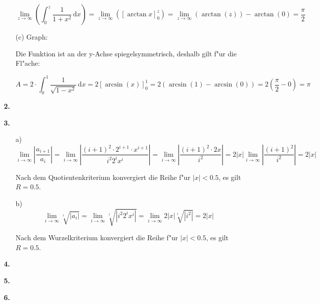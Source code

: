 \documentclass[a4paper,11pt,fleqn]{scrartcl}
\newcommand{\bra}[1]{\left(#1\right)}
\newcommand{\limz}[1]{\lim\limits_{z \rightarrow \infty}\bra{#1}}
\newcommand{\dX}[1]{\, \mathrm{d}#1}
\newcommand{\dx}[0]{\dX{x}}
\begin{document}
\begin{enumerate}
\begin{enumerate}
        \[ \limz{\int_0^z \frac{1}{1+x^2} \dx} = \limz{\left[ \arctan x \right]_0^z}  =
            \limz{\arctan(z)} - \arctan(0) = \frac{\pi}{2} \]

    \item[(c)]
        Graph:


        Die Funktion ist an der y-Achse spiegelsymmetrisch, deshalb gilt f"ur die Fl"ache:

        \[ A = 2 \cdot \int_0^1 \frac{1}{\sqrt{1-x^2}} \dx = 2 \left[ \arcsin(x) \right]_0^1 = 2 \bra{\arcsin(1)-\arcsin(0)} = 2(\frac{\pi}{2} - 0) = \pi \]

    \end{enumerate}

\item[\textbf{2.}]


\item[\textbf{3.}]
    \begin{enumerate}
        
    \item[a)]
        \[ 
        \lim_{i\rightarrow\infty} \left| \frac{a_{i+1}}{a_i}\right| =
        \lim_{i\rightarrow\infty} \left| \frac{(i+1)^2\cdot 2^{i+1}\cdot x^{i+1}}{i^2 2^i x^i}\right| =
        \lim_{i\rightarrow\infty} \left| \frac{(i+1)^2\cdot 2x}{i^2}\right| =
        2\left| x\right|\lim_{i\rightarrow\infty} \left| \frac{(i+1)^2}{i^2}\right| =
        2\left| x \right|
        \]

        Nach dem Quotientenkriterium konvergiert die Reihe f"ur $|x| < 0.5$, es gilt $R = 0.5$.

    \item[b)]
        \[
        \lim_{i\rightarrow\infty} \sqrt[i]{|a_i|} =
        \lim_{i\rightarrow\infty}  \sqrt[i]{|i^2 2^i x^i|} =
        \lim_{i\rightarrow\infty}  2|x|\sqrt[i]{|i^2|} =
        2|x|
        \]

        Nach dem Wurzelkriterium konvergiert die Reihe f"ur $|x| < 0.5$, es gilt $R = 0.5$.
    \end{enumerate}
    

\item[\textbf{4.}]


\item[\textbf{5.}]


\item[\textbf{6.}]

\end{enumerate}
\end{document}
